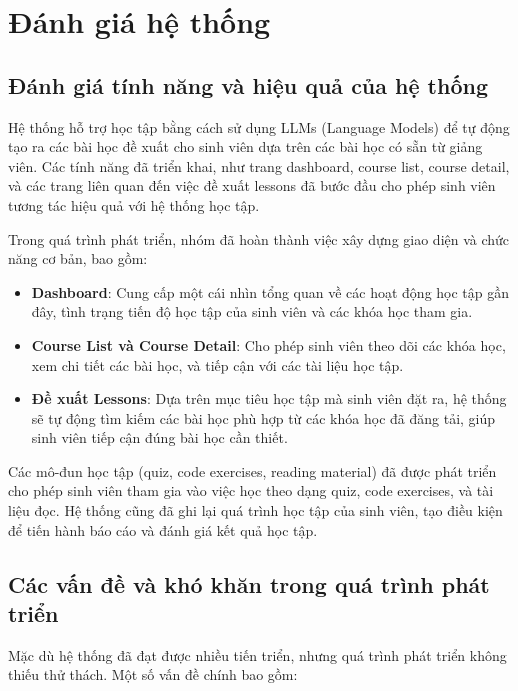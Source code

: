 \chapter{Đánh giá hệ thống}

\section{Đánh giá tính năng và hiệu quả của hệ thống}

Hệ thống hỗ trợ học tập bằng cách sử dụng LLMs (Language Models) để tự động tạo ra các bài học đề xuất cho sinh viên dựa trên các bài học có sẵn từ giảng viên. Các tính năng đã triển khai, như trang dashboard, course list, course detail, và các trang liên quan đến việc đề xuất lessons đã bước đầu cho phép sinh viên tương tác hiệu quả với hệ thống học tập.

Trong quá trình phát triển, nhóm đã hoàn thành việc xây dựng giao diện và chức năng cơ bản, bao gồm:

\begin{itemize}
    \item \textbf{Dashboard}: Cung cấp một cái nhìn tổng quan về các hoạt động học tập gần đây, tình trạng tiến độ học tập của sinh viên và các khóa học tham gia.
    \item \textbf{Course List và Course Detail}: Cho phép sinh viên theo dõi các khóa học, xem chi tiết các bài học, và tiếp cận với các tài liệu học tập.
    \item \textbf{Đề xuất Lessons}: Dựa trên mục tiêu học tập mà sinh viên đặt ra, hệ thống sẽ tự động tìm kiếm các bài học phù hợp từ các khóa học đã đăng tải, giúp sinh viên tiếp cận đúng bài học cần thiết.
\end{itemize}

Các mô-đun học tập (quiz, code exercises, reading material) đã được phát triển cho phép sinh viên tham gia vào việc học theo dạng quiz, code exercises, và tài liệu đọc. Hệ thống cũng đã ghi lại quá trình học tập của sinh viên, tạo điều kiện để tiến hành báo cáo và đánh giá kết quả học tập.

\section{Các vấn đề và khó khăn trong quá trình phát triển}

Mặc dù hệ thống đã đạt được nhiều tiến triển, nhưng quá trình phát triển không thiếu thử thách. Một số vấn đề chính bao gồm:

